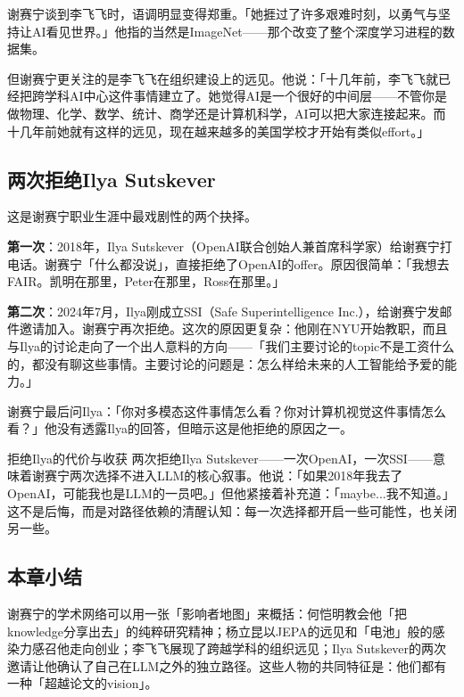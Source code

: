 \documentclass[a4paper]{article}
\begin{document}
谢赛宁谈到李飞飞时，语调明显变得郑重。「她捱过了许多艰难时刻，以勇气与坚持让AI看见世界。」他指的当然是ImageNet——那个改变了整个深度学习进程的数据集。

但谢赛宁更关注的是李飞飞在组织建设上的远见。他说：「十几年前，李飞飞就已经把跨学科AI中心这件事情建立了。她觉得AI是一个很好的中间层——不管你是做物理、化学、数学、统计、商学还是计算机科学，AI可以把大家连接起来。而十几年前她就有这样的远见，现在越来越多的美国学校才开始有类似effort。」

\subsection{两次拒绝Ilya Sutskever}

这是谢赛宁职业生涯中最戏剧性的两个抉择。

\textbf{第一次}：2018年，Ilya Sutskever（OpenAI联合创始人兼首席科学家）给谢赛宁打电话。谢赛宁「什么都没说」，直接拒绝了OpenAI的offer。原因很简单：「我想去FAIR。凯明在那里，Peter在那里，Ross在那里。」

\textbf{第二次}：2024年7月，Ilya刚成立SSI（Safe Superintelligence Inc.），给谢赛宁发邮件邀请加入。谢赛宁再次拒绝。这次的原因更复杂：他刚在NYU开始教职，而且与Ilya的讨论走向了一个出人意料的方向——「我们主要讨论的topic不是工资什么的，都没有聊这些事情。主要讨论的问题是：怎么样给未来的人工智能给予爱的能力。」

谢赛宁最后问Ilya：「你对多模态这件事情怎么看？你对计算机视觉这件事情怎么看？」他没有透露Ilya的回答，但暗示这是他拒绝的原因之一。

\begin{warningbox}{拒绝Ilya的代价与收获}
两次拒绝Ilya Sutskever——一次OpenAI，一次SSI——意味着谢赛宁两次选择不进入LLM的核心叙事。他说：「如果2018年我去了OpenAI，可能我也是LLM的一员吧。」但他紧接着补充道：「maybe...我不知道。」这不是后悔，而是对路径依赖的清醒认知：每一次选择都开启一些可能性，也关闭另一些。
\end{warningbox}

\subsection{本章小结}
谢赛宁的学术网络可以用一张「影响者地图」来概括：何恺明教会他「把knowledge分享出去」的纯粹研究精神；杨立昆以JEPA的远见和「电池」般的感染力感召他走向创业；李飞飞展现了跨越学科的组织远见；Ilya Sutskever的两次邀请让他确认了自己在LLM之外的独立路径。这些人物的共同特征是：他们都有一种「超越论文的vision」。
\end{document}
